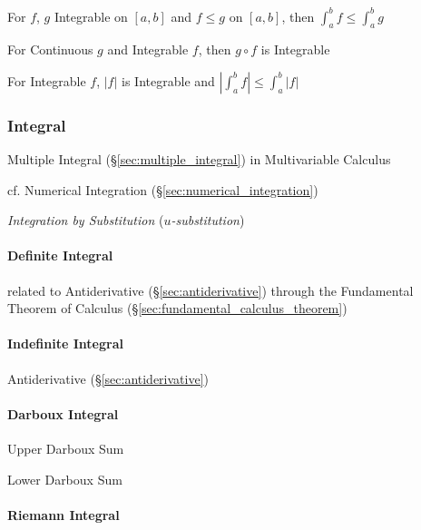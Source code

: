 For $f$, $g$ Integrable on $[a,b]$ and $f \leq g$ on $[a,b]$, then
$\int_a^b f \leq \int_a^b g$

For Continuous $g$ and Integrable $f$, then $g \circ f$ is Integrable

For Integrable $f$, $|f|$ is Integrable and $|\int_a^b f| \leq
\int_a^b |f|$



\subsubsection{Integral}\label{sec:integral}

\fist Multiple Integral (\S\ref{sec:multiple_integral}) in Multivariable
Calculus

cf. Numerical Integration (\S\ref{sec:numerical_integration})

\emph{Integration by Substitution} (\emph{$u$-substitution})



\paragraph{Definite Integral}\label{sec:definite_integral}\hfill

\fist related to Antiderivative (\S\ref{sec:antiderivative}) through the
Fundamental Theorem of Calculus (\S\ref{sec:fundamental_calculus_theorem})



\paragraph{Indefinite Integral}\label{sec:indefinite_integral}\hfill

\fist Antiderivative (\S\ref{sec:antiderivative})



\paragraph{Darboux Integral}\label{sec:darboux_integral}\hfill

Upper Darboux Sum

Lower Darboux Sum



\paragraph{Riemann Integral}\label{sec:riemann_integral}\hfill

